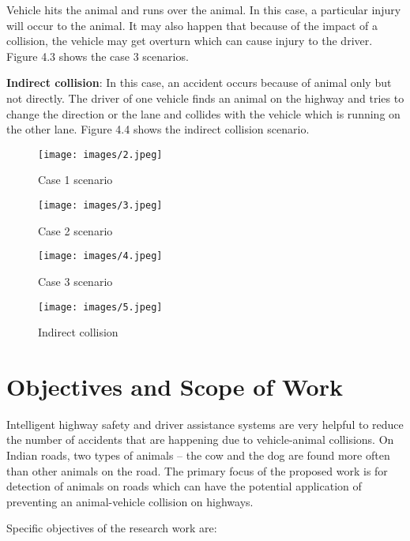 \documentclass[14pt,a4paper,final]{extreport}
\begin{document}
\item Vehicle hits the animal and runs over the animal. In this case, a particular injury will occur to the animal. It may also happen that because of the impact of a collision, the vehicle may get overturn which can cause injury to the driver. Figure 4.3 shows the case 3 scenarios.
\item \textbf{Indirect collision}: In this case, an accident occurs because of animal only but not directly. The driver of one vehicle finds an animal on the highway and tries to change the direction or the lane and collides with the vehicle which is running on the other lane. Figure 4.4 shows the indirect collision scenario.
\begin{figure}[h]
	\begin{center}
		\texttt{[image: images/2.jpeg]}
		\vspace{.1 cm}
		\caption[Case 1 scenario]{Case 1 scenario}
	\end{center}
\end{figure}
\begin{figure}[h]
	\begin{center}
		\texttt{[image: images/3.jpeg]}
		\vspace{.1 cm}
		\caption[Case 2 scenario ]{Case 2 scenario}
	\end{center}
\end{figure}
\begin{figure}[h]
	\begin{center}
		\texttt{[image: images/4.jpeg]}
		\vspace{.1 cm}
		\caption[Case 3 scenario]{Case 3 scenario}
	\end{center}
\end{figure}
\begin{figure}[h]
	\begin{center}
		\texttt{[image: images/5.jpeg]}
		\vspace{.1 cm}
		\caption[Indirect collision]{Indirect collision}
	\end{center}
\end{figure}


\chapter{Objectives and Scope of Work}
\item Intelligent highway safety and driver assistance systems are very helpful to reduce the number of accidents that are happening due to vehicle-animal collisions. On Indian roads, two types of animals – the cow and the dog are found more often than other animals on the road. The primary focus of the proposed work is for detection of animals on roads which can have the potential application of preventing an animal-vehicle collision on highways. \item Specific objectives of the research work are:
\end{document}
